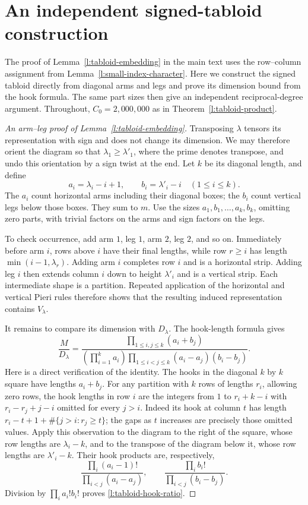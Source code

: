 \section{An independent signed-tabloid construction}
\label{l:tabloid-supplement}

The proof of Lemma~\ref{l:tabloid-embedding} in the main text uses the
row--column assignment from Lemma~\ref{l:small-index-character}.
Here we construct the signed tabloid directly from diagonal arms and
legs and prove its dimension bound from the hook formula. The same
part sizes then give an independent reciprocal-degree argument.
Throughout, $C_0=2{,}000{,}000$ as in
Theorem~\ref{l:tabloid-product}.

\begin{proof}[An arm--leg proof of Lemma~\ref{l:tabloid-embedding}]
Transposing $\lambda$ tensors its representation with sign and does
not change its dimension.  We may therefore orient the diagram so that
$\lambda_1\ge\lambda'_1$, where the prime denotes transpose, and undo
this orientation by a sign twist at the end.
Let $k$ be its diagonal length, and define
\[
 a_i=\lambda_i-i+1,\qquad b_i=\lambda'_i-i
 \quad(1\le i\le k).
\]
The $a_i$ count horizontal arms including their diagonal boxes; the
$b_i$ count vertical legs below those boxes.  They sum to $m$.
Use the sizes $a_1,b_1,\ldots,a_k,b_k$, omitting zero parts, with
trivial factors on the arms and sign factors on the legs.

To check occurrence, add arm $1$, leg $1$, arm $2$, leg $2$, and so
on.  Immediately before arm $i$, rows above $i$ have their final
lengths, while row $r\ge i$ has length $\min(i-1,\lambda_r)$.
Adding arm $i$ completes row $i$ and is a horizontal strip.
Adding leg $i$ then extends column $i$ down to height $\lambda'_i$
and is a vertical strip.  Each intermediate shape is a partition.
Repeated application of the horizontal and vertical Pieri rules
therefore shows that the resulting induced representation contains
$V_\lambda$.

It remains to compare its dimension with $D_\lambda$.  The hook-length
formula gives
\begin{equation}
 \frac{M}{D_\lambda}
 =\frac{\displaystyle\prod_{1\le i,j\le k}(a_i+b_j)}
 {\displaystyle\left(\prod_{i=1}^k a_i\right)
       \prod_{1\le i<j\le k}(a_i-a_j)(b_i-b_j)}.
 \label{l:tabloid-hook-ratio}
\end{equation}
Here is a direct verification of the identity.  The hooks in the
diagonal $k$ by $k$ square have lengths $a_i+b_j$.
For any partition with $k$ rows of lengths $r_i$, allowing zero rows,
the hook lengths in row $i$ are the integers from $1$ to $r_i+k-i$
with $r_i-r_j+j-i$ omitted for every $j>i$.  Indeed its hook at column
$t$ has length $r_i-t+1+\#\{j>i:r_j\ge t\}$; the gaps as $t$
increases are precisely those omitted values.  Apply this observation
to the diagram to the right of the square, whose row lengths are
$\lambda_i-k$, and to the transpose of the diagram below it, whose
row lengths are $\lambda'_i-k$.  Their hook products are, respectively,
\[
 \frac{\prod_i(a_i-1)!}{\prod_{i<j}(a_i-a_j)},
 \qquad
 \frac{\prod_i b_i!}{\prod_{i<j}(b_i-b_j)}.
\]
Division by $\prod_i a_i!b_i!$ proves
\eqref{l:tabloid-hook-ratio}.


\end{proof}
